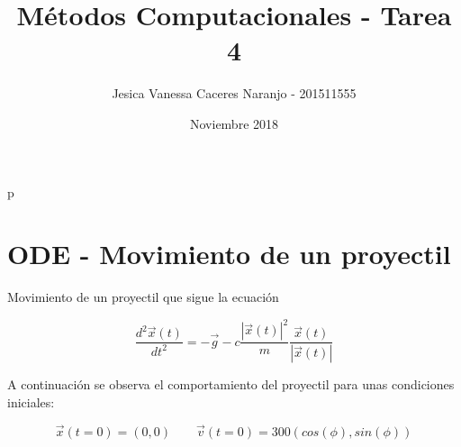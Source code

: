 \documentclass{article}
\title{Métodos Computacionales - Tarea 4}
\author{Jesica Vanessa Caceres Naranjo - 201511555}
\date{Noviembre 2018}
\begin{document}
\maketitle
p
\section*{ODE - Movimiento de un proyectil}

Movimiento de un proyectil que sigue la ecuación

\begin{equation}
    \frac{d^{2}\vec{x}(t)}{dt^{2}}=-\vec{g}-c\frac{|\vec{x}(t)|^{2}}{m}\frac{\vec{x}(t)}{|\vec{x}(t)|}
\end{equation}

A continuación se observa el comportamiento del proyectil para unas condiciones iniciales:

\begin{equation}
    \vec{x}(t=0)=(0,0) \qquad \vec{v}(t=0)=300(cos(\phi),sin(\phi))
\end{equation}
\end{document}
